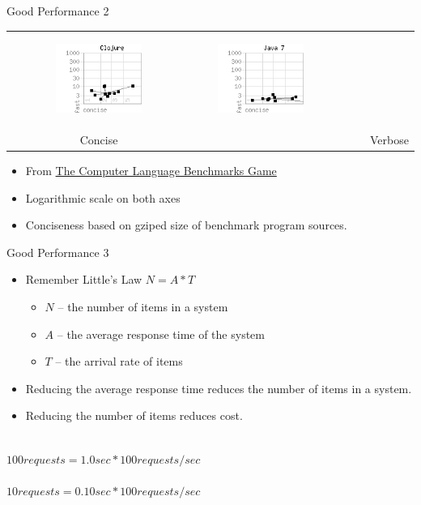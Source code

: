 \documentclass[t]{beamer}
\begin{document}
\begin{frame}{Good Performance 2}
\begin{tabular}{lccccc}
     & \begin{minipage}{0.625in}{\begin{figure}\includegraphics[scale=0.30]{clojure-CT.png}\end{figure}}\end{minipage}
     & \begin{minipage}{0.625in}{\begin{figure}\includegraphics[scale=0.30]{java7-CT.png}\end{figure}}\end{minipage}
     \\
     & Concise & & & & Verbose
     \\
  \end{tabular}


  \begin{itemize}
  \item From \href{http://shootout.alioth.debian.org/}{The Computer 
    Language Benchmarks Game}
  \item Logarithmic scale on both axes
   \item Conciseness based on gziped size of benchmark program sources.
  \end{itemize}
  \note{}
 \end{frame}

\begin{frame}{Good Performance 3}
  \begin{itemize}
  \item Remember Little's Law $ N = A * T $
    \begin{itemize}
    \item $N$ -- the number of items in a system
    \item $A$ -- the average response time of the system
    \item $T$ -- the arrival rate of items
    \end{itemize}
  \item Reducing the average response time reduces the number of items
    in a system.
  \item Reducing the number of items reduces cost.
  \end{itemize}
  $ $\\
  $100 requests = 1.0 sec * 100 requests/sec$ \\
  $ $\\
  $ 10 requests = 0.10 sec * 100 requests/sec$ \\
\note{}
 \end{frame}
\end{document}
